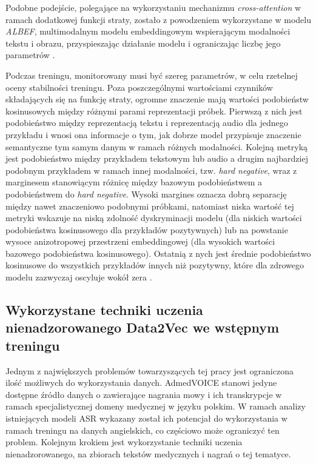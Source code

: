 Podobne podejście, polegające na wykorzystaniu mechanizmu \textit{cross-attention} w ramach dodatkowej funkcji straty, zostało z powodzeniem wykorzystane w modelu \textit{ALBEF}, multimodalnym modelu embeddingowym wspierającym modalności tekstu i obrazu, przyspieszając działanie modelu i ograniczając liczbę jego parametrów \cite{li2021align}.


Podczas treningu, monitorowany musi być szereg parametrów, w celu rzetelnej oceny stabilności treningu. Poza poszczególnymi wartościami czynników składających się na funkcję straty, ogromne znaczenie mają wartości podobieństw kosinusowych między różnymi parami reprezentacji próbek. Pierwszą z nich jest podobieństwo między reprezentacją tekstu i reprezentacją audio dla jednego przykładu i wnosi ona informacje o tym, jak dobrze model przypisuje znaczenie semantyczne tym samym danym w ramach różnych modalności. Kolejną metryką jest podobieństwo między przykładem tekstowym lub audio a drugim najbardziej podobnym przykładem w ramach innej modalności, tzw. \textit{hard negative}, wraz z marginesem stanowiącym różnicę między bazowym podobieństwem a podobieństwem do \textit{hard negative}. Wysoki margines oznacza dobrą separację między nawet znaczeniowo podobnymi próbkami, natomiast niska wartość tej metryki wskazuje na niską zdolność dyskryminacji modelu (dla niskich wartości podobieństwa kosinusowego dla przykładów pozytywnych) lub na powstanie wysoce anizotropowej przestrzeni embeddingowej (dla wysokich wartości bazowego podobieństwa kosinusowego). Ostatnią z nych jest średnie podobieństwo kosinusowe do wszystkich przykładów innych niż pozytywny, które dla zdrowego modelu zazwyczaj oscyluje wokół zera \cite{infonceUnderstanding}.

\subsection{Wykorzystane techniki uczenia nienadzorowanego Data2Vec we wstępnym treningu}

Jednym z największych problemów towarzyszących tej pracy jest ograniczona ilość możliwych do wykorzystania danych. AdmedVOICE stanowi jedyne dostępne źródło danych o zawierające nagrania mowy i ich transkrypcje w ramach specjalistycznej domeny medycznej w języku polskim. W ramach analizy istniejących modeli ASR wykazany został ich potencjał do wykorzystania w ramach treningu na danych angielskich, co częściowo może ograniczyć ten problem. Kolejnym krokiem jest wykorzystanie techniki uczenia nienadzorowanego, na zbiorach tekstów medycznych i nagrań o tej tematyce.

